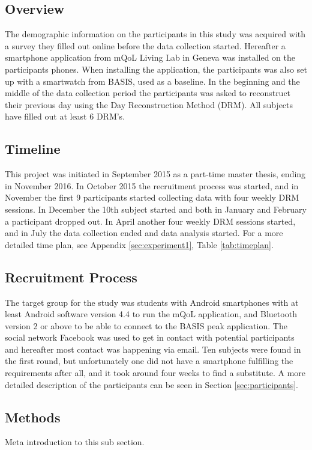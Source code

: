 \documentclass[12pt]{article} %
\begin{document}
\subsection{Overview}
The demographic information on the participants in this study was acquired with a survey they filled out online before the data collection started. Hereafter a smartphone application from mQoL Living Lab in Geneva was installed on the participants phones. When installing the application, the participants was also set up with a smartwatch from BASIS, used as a baseline. In the beginning and the middle of the data collection period the participants was asked to reconstruct their previous day using the Day Reconstruction Method (DRM). All subjects have filled out at least 6 DRM's. 

\subsection{Timeline}
This project was initiated in September 2015 as a part-time master thesis, ending in November 2016. In October 2015 the recruitment process was started, and in November the first 9 participants started collecting data with four weekly DRM sessions. In December the 10th subject started and both in January and February a participant dropped out. In April another four weekly DRM sessions started, and in July the data collection ended and data analysis started. For a more detailed time plan, see Appendix \ref{sec:experiment1}, Table \ref{tab:timeplan}. 

\subsection{Recruitment Process}
The target group for the study was students with Android smartphones with at least Android software version 4.4 to run the mQoL application, and Bluetooth version 2 or above to be able to connect to the BASIS peak application. The social network Facebook was used to get in contact with potential participants and hereafter most contact was happening via email. Ten subjects were found in the first round, but unfortunately one did not have a smartphone fulfilling the requirements after all, and it took around four weeks to find a substitute. A more detailed description of the participants can be seen in Section \ref{sec:participants}.

\subsection{Methods}
Meta introduction to this sub section. 
\end{document}
